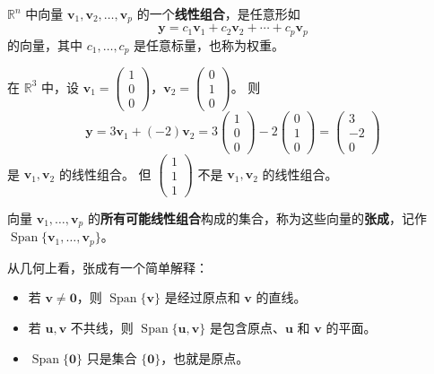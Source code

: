 \begin{definition}
$\mathbb{R}^n$ 中向量 $\mathbf{v}_1,\mathbf{v}_2,\ldots,\mathbf{v}_p$ 的一个\textbf{线性组合}，是任意形如
\[ \mathbf{y}=c_1\mathbf{v}_1+c_2\mathbf{v}_2+\cdots+c_p\mathbf{v}_p \]
的向量，其中 $c_1,\ldots,c_p$ 是任意标量，也称为权重。
\end{definition}

\begin{example}
在 $\mathbb{R}^3$ 中，设 $\mathbf{v}_1=\begin{pmatrix}1\\0\\0\end{pmatrix}$，$\mathbf{v}_2=\begin{pmatrix}0\\1\\0\end{pmatrix}$。
则
\[
\mathbf{y}=3\mathbf{v}_1+(-2)\mathbf{v}_2=3\begin{pmatrix}1\\0\\0\end{pmatrix}-2\begin{pmatrix}0\\1\\0\end{pmatrix}=\begin{pmatrix}3\\-2\\0\end{pmatrix}
\]
是 $\mathbf{v}_1,\mathbf{v}_2$ 的线性组合。
但 $\begin{pmatrix}1\\1\\1\end{pmatrix}$ 不是 $\mathbf{v}_1,\mathbf{v}_2$ 的线性组合。
\end{example}

\begin{definition}
向量 $\mathbf{v}_1,\ldots,\mathbf{v}_p$ 的\textbf{所有可能线性组合}构成的集合，称为这些向量的\textbf{张成}，记作 $\operatorname{Span}\{\mathbf{v}_1,\ldots,\mathbf{v}_p\}$。
\end{definition}

从几何上看，张成有一个简单解释：
\begin{itemize}
    \item 若 $\mathbf{v}\neq\mathbf{0}$，则 $\operatorname{Span}\{\mathbf{v}\}$ 是经过原点和 $\mathbf{v}$ 的直线。
    \item 若 $\mathbf{u},\mathbf{v}$ 不共线，则 $\operatorname{Span}\{\mathbf{u},\mathbf{v}\}$ 是包含原点、$\mathbf{u}$ 和 $\mathbf{v}$ 的平面。
    \item $\operatorname{Span}\{\mathbf{0}\}$ 只是集合 $\{\mathbf{0}\}$，也就是原点。
\end{itemize}

